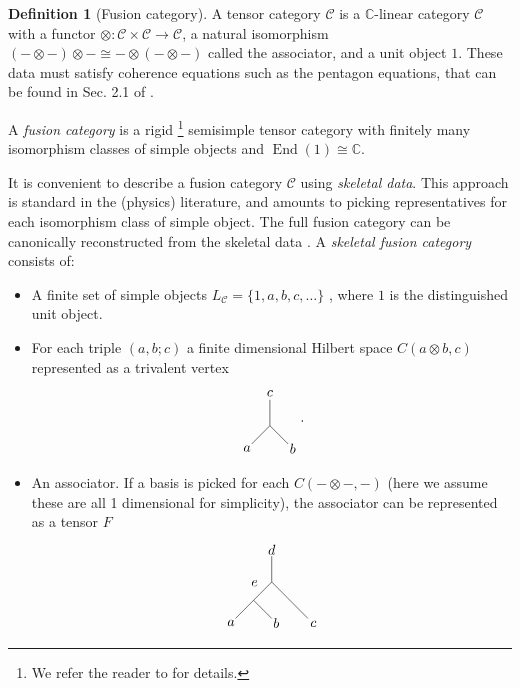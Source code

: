 \documentclass[aps,prx,twocolumn,superscriptaddress,noshowkeys]{revtex4-2}  %
\DeclareMathOperator{\End}{End}
\newcommand{\cat}{\mathcal{C}}
\theoremstyle{plain}%
\theoremstyle{definition}
\newtheorem{definition}{Definition}[section]
\theoremstyle{remark}
\begin{document}
\begin{definition}[Fusion category]
	A tensor category $\cat$ is a $\mathbb{C}$-linear category $\cat$ with a functor $\otimes:\cat\times\cat\to\cat$, a natural isomorphism $(-\otimes-)\otimes-\cong-\otimes(-\otimes-)$ called the associator, and a unit object $1$.
	These data must satisfy coherence equations such as the pentagon equations, that can be found in Sec. 2.1 of \cite{Etingof2015}.
	
	A \emph{fusion category} is a rigid \footnote{We refer the reader to \cite{Etingof2015} for details.} semisimple tensor category with finitely many isomorphism classes of simple objects and $\End(1)\cong \mathbb{C}$.
	
	It is convenient to describe a fusion category $\cat$ using \emph{skeletal data}. This approach is standard in the (physics) literature, and amounts to picking representatives for each isomorphism class of simple object. The full fusion category can be canonically reconstructed from the skeletal data \cite{BBJSkeletal}. A \emph{skeletal fusion category} consists of:
	\begin{itemize}
		\item A finite set of simple objects $L_\mathcal{C}=\{1,a,b,c,\ldots\}$ , where $1$ is the distinguished unit object.
		\item For each triple $(a,b;c)$ a finite dimensional Hilbert space $C(a\otimes b,c)$ represented as a trivalent vertex
		\begin{equation}
		\begin{tikzpicture}[scale=0.65,baseline=(current bounding box.center)]
		\draw (-.707,-.707)--(0,0) node[pos=-.25] {$a$};
		\draw (.707,-.707)--(0,0) node[pos=-.25] {$b$};
		\draw (0,0)--(0,1) node[pos=1.25] {$c$};
		\end{tikzpicture}.
		\end{equation} 
		\item An associator. If a basis is picked for each $C(-\otimes -,-)$ (here we assume these are all 1 dimensional for simplicity), the associator can be represented as a tensor $F$
		\begin{equation}
		\begin{tikzpicture}[scale=0.65,baseline=(current bounding box.center)]
		\draw (0,0)--(0,1) node[pos=1.25] {$d$};
		\draw (0,0)--(1.41,-1.41) node[pos=1.15] {$c$};
		\draw (0,0)--(-.707,-.707) node [pos=.5,above left] {$e$};
		\draw (-.707,-.707)--(-1.41,-1.41)node[pos=1.25] {$a$};
		\draw (-.707,-.707)--(0,-1.41)node[pos=1.25] {$b$};
		\end{tikzpicture}

\end{equation}
\end{itemize}
\end{definition}
\end{document}
